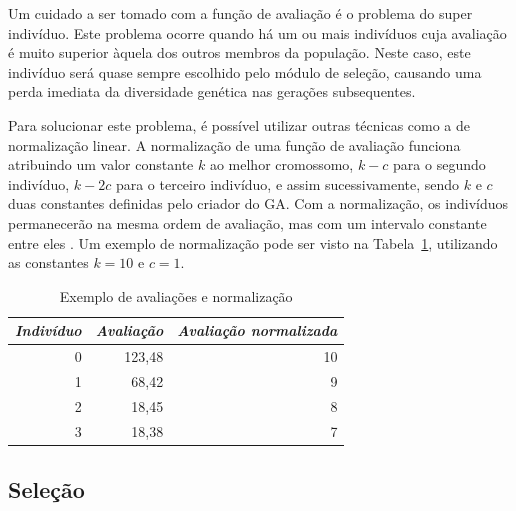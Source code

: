 \documentclass[12pt,oneside,a4paper,english,french,spanish,brazil,]{abntex2}
\begin{document}
Um cuidado a ser tomado com a função de avaliação é o problema do super indivíduo. Este problema ocorre quando há um ou mais indivíduos cuja avaliação é muito superior àquela dos outros membros da população. Neste caso, este indivíduo será quase sempre escolhido pelo módulo de seleção, causando uma perda imediata da diversidade genética nas gerações subsequentes.

Para solucionar este problema, é possível utilizar outras técnicas como a de normalização linear. A normalização de uma função de avaliação funciona atribuindo um valor constante \(k\) ao melhor cromossomo, \(k - c\) para o segundo indivíduo, \(k - 2c\) para o terceiro indivíduo, e assim sucessivamente, sendo \(k\) e \(c\) duas constantes definidas pelo criador do GA. Com a normalização, os indivíduos permanecerão na mesma ordem de avaliação, mas com um intervalo constante entre eles  \cite{linden:2008}. Um exemplo de normalização pode ser visto na Tabela~\ref{tab:Normalizacao_Avaliacao}, utilizando as constantes \(k = 10\) e \(c = 1\).

\begin{table}[tbp]
\centering
\caption{Exemplo de avaliações e normalização}
\label{tab:Normalizacao_Avaliacao}
\begin{tabular}{rrr}
\hline
\multicolumn{1}{l}{\textit{\textbf{Indivíduo}}} & \multicolumn{1}{l}{\textit{\textbf{Avaliação}}} & \multicolumn{1}{l}{\textit{\textbf{Avaliação normalizada}}} \\ \hline
0                                                & 123,48                                           & 10                                                           \\
1                                                & 68,42                                            & 9                                                            \\
2                                                & 18,45                                            & 8                                                            \\
3                                                & 18,38                                            & 7    \\ \hline                                                       
\end{tabular}
\end{table}

\subsection{Seleção}
\end{document}
